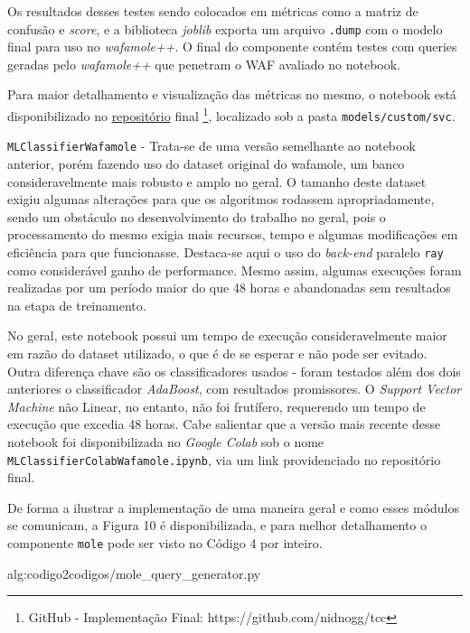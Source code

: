 \begin{alineas}
Os resultados desses testes sendo colocados em métricas como a matriz de confusão e \textit{score}, e a biblioteca \textit{joblib} exporta um arquivo \verb+.dump+ com o modelo final para uso no \textit{wafamole++}. O final do componente contém testes com queries geradas pelo \textit{wafamole++} que penetram o WAF avaliado no notebook.

Para maior detalhamento e visualização das métricas no mesmo, o notebook está disponibilizado no \href{https://github.com/nidnogg/tcc}{repositório} final \footnote{GitHub - Implementação Final: https://github.com/nidnogg/tcc}, localizado sob a pasta \verb+models/custom/svc+.

\item \verb+MLClassifierWafamole+ - Trata-se de uma versão semelhante ao notebook anterior, porém fazendo uso do dataset original do wafamole, um banco consideravelmente mais robusto e amplo no geral. O tamanho deste dataset exigiu algumas alterações para que os algoritmos rodassem apropriadamente, sendo um obstáculo no desenvolvimento do trabalho no geral, pois o processamento do mesmo exigia mais recursos, tempo e algumas modificações em eficiência para que funcionasse. Destaca-se aqui o uso do \textit{back-end} paralelo \verb+ray+ \cite{ray_backend_parallel} como considerável ganho de performance. Mesmo assim, algumas execuções foram realizadas por um período maior do que 48 horas e abandonadas sem resultados na etapa de treinamento.

No geral, este notebook possui um tempo de execução consideravelmente maior  em razão do dataset utilizado, o que é de se esperar e não pode ser evitado. Outra diferença chave são os classificadores usados - foram testados além dos dois anteriores o classificador \textit{AdaBoost}, com resultados promissores. O \textit{Support Vector Machine} não Linear, no entanto, não foi frutífero, requerendo um tempo de execução que excedia 48 horas. Cabe salientar que a versão mais recente desse notebook foi disponibilizada no \textit{Google Colab} sob o nome \verb+MLClassifierColabWafamole.ipynb+, via um link providenciado no repositório final.
\end{alineas}

De forma a ilustrar a implementação de uma maneira geral e como esses módulos se comunicam, a Figura 10 é disponibilizada, e para melhor detalhamento o componente \verb+mole+ pode ser visto no Código 4 por inteiro.

\label{sec:codigos}
 {alg:codigo2}{codigos/mole_query_generator.py}
\bigskip

